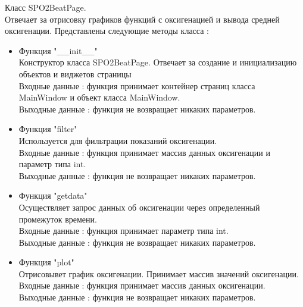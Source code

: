 \documentclass[a4document]{article}
\begin{document}
{\begin{itemize}
        Класс SPO2BeatPage.\\
        Отвечает за отрисовку графиков функций с оксигенацией и вывода средней оксигенации.
        Представлены следующие методы класса :
        \begin{itemize}
            \item Функция "\_\_init\_\_" \\
                Конструктор класса SPO2BeatPage. Отвечает за создание и инициализацию объектов и виджетов страницы \\
                Входные данные : функция принимает контейнер страниц класса \\MainWindow и объект класса MainWindow.\\
                Выходные данные : функция не возвращает никаких параметров.
            \newpage
            \item Функция "filter" \\
                Используется для фильтрации показаний оксигенации.\\
                Входные данные : функция принимает массив данных оксигенации и параметр типа int.\\
                Выходные данные : функция не возвращает никаких параметров.
            \item Функция "getdata" \\
                Осуществляет запрос данных об оксигенации через определенный промежуток времени.\\
                Входные данные : функция принимает параметр типа int.\\
                Выходные данные : функция не возвращает никаких параметров.
            \item Функция "plot" \\
                Отрисовывет график оксигенации. Принимает массив значений оксигенации.\\
                Входные данные : функция принимает массив данных оксигенации.\\
                Выходные данные : функция не возвращает никаких параметров.
        \end{itemize}
        

\end{itemize}}
\end{document}
